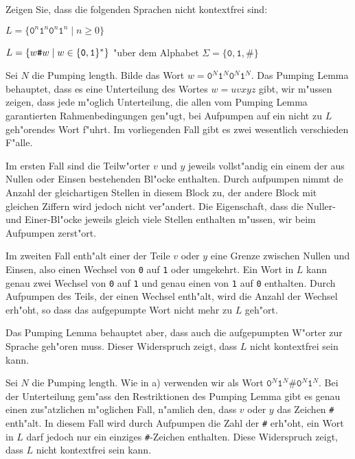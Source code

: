 Zeigen Sie, dass die folgenden Sprachen nicht kontextfrei sind:
\begin{teilaufgaben}
\item $L=\{\texttt{0}^n\texttt{1}^n\texttt{0}^n\texttt{1}^n\;|\;n\ge 0\}$
\item $L=\{w{\texttt{\#}}w\;|\;w\in\{{\tt 0},{\tt 1}\}^*\}$ "uber dem Alphabet
$\Sigma=\{\texttt{0},\texttt{1},\texttt{\#}\}$
\end{teilaufgaben}

\begin{loesung}
\begin{teilaufgaben}
\item Sei $N$ die Pumping length.
Bilde das Wort $w=\texttt{0}^N\texttt{1}^N\texttt{0}^N\texttt{1}^N$.
Das Pumping Lemma
behauptet, dass es eine Unterteilung des Wortes $w=uvxyz$ gibt, wir
m"ussen zeigen, dass jede m"oglich Unterteilung, die allen vom
Pumping Lemma garantierten Rahmenbedingungen gen"ugt, bei Aufpumpen
auf ein nicht zu $L$ geh"orendes Wort f"uhrt.
Im vorliegenden Fall
gibt es zwei wesentlich verschieden F"alle.

Im ersten Fall sind die
Teilw"orter $v$ und $y$ jeweils vollst"andig ein einem der aus Nullen
oder Einsen bestehenden Bl"ocke enthalten. Durch aufpumpen nimmt de
Anzahl der gleichartigen Stellen in diesem Block zu, der andere Block
mit gleichen Ziffern wird jedoch nicht ver"andert.
Die Eigenschaft, dass die Nuller- und
Einer-Bl"ocke jeweils gleich viele Stellen enthalten m"ussen, wir
beim Aufpumpen zerst"ort.

Im zweiten Fall enth"alt einer der Teile $v$ oder $y$ eine
Grenze zwischen Nullen und Einsen, also einen Wechsel von
\texttt{0} auf \texttt{1} oder umgekehrt.
Ein Wort in $L$ kann
genau zwei Wechsel von \texttt{0} auf \texttt{1} und genau einen
von \texttt{1} auf \texttt{0} enthalten.
Durch Aufpumpen des Teils,
der einen Wechsel enth"alt, wird die Anzahl der Wechsel erh"oht,
so dass das aufgepumpte Wort nicht mehr zu $L$ geh"ort.

Das Pumping Lemma behauptet aber, dass auch die aufgepumpten W"orter
zur Sprache geh"oren muss. Dieser Widerspruch zeigt, dass $L$
nicht kontextfrei sein kann.
\item Sei $N$ die Pumping length. Wie in a) verwenden wir als
Wort $\texttt{0}^N\texttt{1}^N\texttt{\#}\texttt{0}^N\texttt{1}^N$.
Bei der Unterteilung
gem"ass den Restriktionen des Pumping Lemma gibt es genau einen zus"atzlichen
m"oglichen Fall, n"amlich den, dass $v$ oder $y$ das Zeichen {\tt\#}
enth"alt.
In diesem Fall wird durch Aufpumpen die Zahl der {\tt\#}
erh"oht, ein Wort in $L$ darf jedoch nur ein einziges {\tt\#}-Zeichen
enthalten.
Diese Widerspruch zeigt, dass $L$ nicht kontextfrei sein kann.
\qedhere
\end{teilaufgaben}
\end{loesung}
